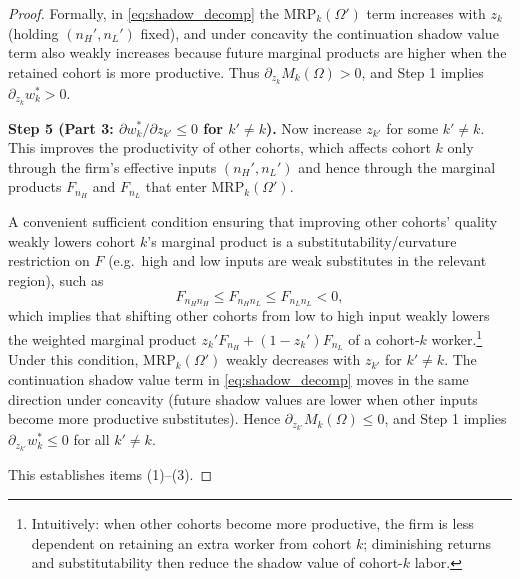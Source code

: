 \begin{proof}
Formally, in \eqref{eq:shadow_decomp} the $\text{MRP}_k(\Omega')$ term increases with $z_k$ (holding $(n_H',n_L')$ fixed),
and under concavity the continuation shadow value term also weakly increases because future marginal products are higher when the
retained cohort is more productive. Thus $\partial_{z_k} M_k(\Omega)>0$, and Step 1 implies
$\partial_{z_k} w_k^*>0$.

\medskip
\noindent\textbf{Step 5 (Part 3: $\partial w_k^*/\partial z_{k'}\le 0$ for $k'\neq k$).}
Now increase $z_{k'}$ for some $k'\neq k$. This improves the productivity of other cohorts, which affects cohort $k$ only through
the firm's effective inputs $(n_H',n_L')$ and hence through the marginal products $F_{n_H}$ and $F_{n_L}$ that enter
$\text{MRP}_k(\Omega')$.

A convenient sufficient condition ensuring that improving other cohorts' quality weakly lowers cohort $k$'s marginal product is a
substitutability/curvature restriction on $F$ (e.g.\ high and low inputs are weak substitutes in the relevant region), such as
\[
F_{n_H n_H}\le F_{n_H n_L}\le F_{n_L n_L}<0,
\]
which implies that shifting other cohorts from low to high input weakly lowers the weighted marginal product
$z_k'F_{n_H}+(1-z_k')F_{n_L}$ of a cohort-$k$ worker.\footnote{Intuitively: when other cohorts become more productive, the firm is less
dependent on retaining an extra worker from cohort $k$; diminishing returns and substitutability then reduce the shadow value of
cohort-$k$ labor.}
Under this condition, $\text{MRP}_k(\Omega')$ weakly decreases with $z_{k'}$ for $k'\neq k$. The continuation shadow value term in
\eqref{eq:shadow_decomp} moves in the same direction under concavity (future shadow values are lower when other inputs become more
productive substitutes).
Hence $\partial_{z_{k'}} M_k(\Omega)\le 0$, and Step 1 implies
$\partial_{z_{k'}} w_k^*\le 0$ for all $k'\neq k$.

\medskip
This establishes items (1)--(3).
\end{proof}

